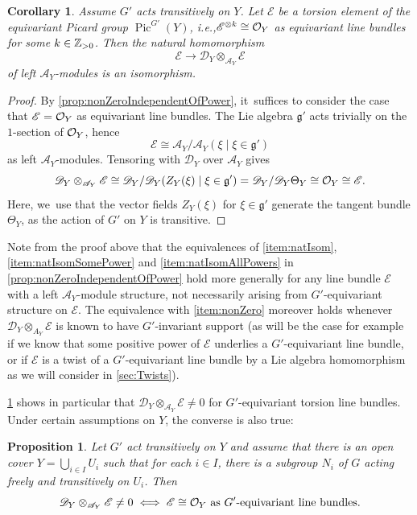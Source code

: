 \documentclass[11pt]{article}
\newcommand{\ie}{i.e.,\xspace}
\newtheorem{prop}[thm]{Proposition}
\newtheorem{cor}[thm]{Corollary}
\newcommand{\cA}{\mathscr{A}}
\newcommand{\frg}{\mathfrak{g}}
\DeclareMathOperator{\Pic}{Pic}
\begin{document}
\begin{cor} \label{prop:torsionGivesNonZero}
Assume $G'$ acts transitively on $Y$. Let $\mathscr{E}$ be a torsion element of the equivariant Picard group $\Pic^{G'}(Y)$, \ie $\mathscr{E}^{\otimes k} \cong \mathcal{O}_Y$ as equivariant line bundles for some $k \in {\mathbb Z}_{>0}$. Then
the natural homomorphism
\[
\mathscr{E} \to \mathscr{D}_Y \otimes_{\cA_Y} \mathscr{E}
\]
of left $\cA_Y$\nobreakdash-mod\-ules is an isomorphism.
\end{cor}

\begin{proof}
By \cref{prop:nonZeroIndependentOfPower}, it~suffices to consider the case that $\mathscr{E} = \mathcal{O}_Y$ as equivariant line bundles. The Lie algebra $\frg'$ acts trivially on the $1$-section of $\mathcal{O}_Y$, hence
\[
\mathscr E \cong \cA_Y/\cA_Y(\xi \mid \xi \in \frg')
\]
as left $\cA_Y$\nobreakdash-mod\-ules. Tensoring with $\mathscr{D}_Y$ over $\cA_Y$ gives
\[
\mathscr{D}_Y \otimes_{\cA_Y} \mathscr E \cong \mathscr{D}_Y/\mathscr{D}_Y(Z_Y(\xi) \mid \xi \in \frg') = \mathscr{D}_Y/\mathscr{D}_Y \Theta_Y \cong \O_Y \cong \mathscr E.
\]
Here, we~use that the vector fields $Z_Y(\xi)$ for $\xi \in \frg'$ generate the tangent bundle $\Theta_Y$, as the action of $G'$ on $Y$ is transitive.
\end{proof}

\begin{rmk} \label{rem:torsionGivesNonZero}
Note from the proof above that the equivalences of \eqref{item:natIsom}, \eqref{item:natIsomSomePower} and \eqref{item:natIsomAllPowers} in \cref{prop:nonZeroIndependentOfPower} hold more generally for any line bundle $\mathscr{E}$ with a left $\cA_Y$\nobreakdash-mod\-ule structure, not necessarily arising from $G'$-equivariant structure on $\mathscr{E}$. The equivalence with \eqref{item:nonZero} moreover holds whenever $\mathscr D_Y \otimes_{A_Y} \mathscr E$ is known to have $G'$-invariant support (as will be the case for example if we know that some positive power of $\mathscr E$ underlies a $G'$-equivariant line bundle, or if $\mathscr E$ is a twist of a $G'$-equivariant line bundle by a Lie algebra homomorphism as we will consider in \cref{sec:Twists}).
\end{rmk}

\cref{prop:torsionGivesNonZero} shows in particular that $\mathscr{D}_Y \otimes_{\cA_Y} \mathscr{E} \neq 0$ for $G'$-equivariant torsion line bundles. Under certain assumptions on $Y$, the converse is also true:

\begin{prop} \label{prop:nonTorsionGivesZero}
Let $G'$ act transitively on $Y$ and assume that there is an open cover $Y = \bigcup_{i \in I} U_i$ such that for each $i \in I$, there is a subgroup $N_i$ of $G$ acting freely and transitively on $U_i$. Then
\[
\mathscr{D}_Y \otimes_{\cA_Y} \mathscr{E} \neq 0
\iff
\mathscr{E} \cong \O_Y \text{ as $G'$-equivariant line bundles}.
\]
\end{prop}
\end{document}
